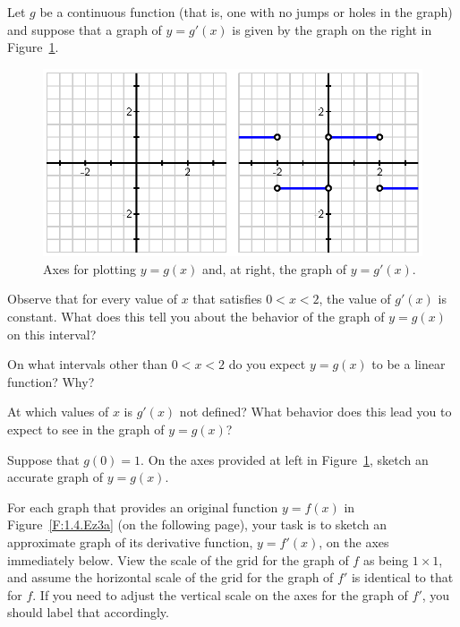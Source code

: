 \begin{exercises}
\item Let $g$ be a continuous function (that is, one with no jumps or holes in the graph) and suppose that a graph of $y= g'(x)$ is given by the graph  on the right in Figure~\ref{F:1.4.Ez2}.
\begin{figure}[h]
  \begin{center}
 \includegraphics{figures/1_4_Ez2.eps} %
   \end{center}
   \caption{Axes for plotting $y = g(x)$ and, at right, the graph of $y = g'(x)$.} \label{F:1.4.Ez2}
\end{figure}
\ba
	\item Observe that for every value of $x$ that satisfies $0 < x < 2$, the value of $g'(x)$ is constant.  What does this tell you about the behavior of the graph of $y = g(x)$ on this interval?
	\item On what intervals other than $0 < x < 2$ do you expect $y = g(x)$ to be a linear function?  Why?
	\item At which values of $x$ is $g'(x)$ not defined?  What behavior does this lead you to expect to see in the graph of $y=g(x)$?
	\item Suppose that $g(0) = 1$.  On the axes provided at left in  Figure~\ref{F:1.4.Ez2}, sketch an accurate graph of $y = g(x)$.
\ea

\newpage

\item For each graph that provides an original function $y = f(x)$ in Figure~\ref{F:1.4.Ez3a} (on the following page), your task is to sketch an approximate graph of its derivative function, $y = f'(x)$, on the axes immediately below.  View the scale of the grid for the graph of $f$ as being $1 \times 1$, and assume the horizontal scale of the grid for the graph of $f'$ is identical to that for $f$.  If you need to adjust the vertical scale on the axes for the graph of $f'$, you should label that accordingly.


\end{exercises}
